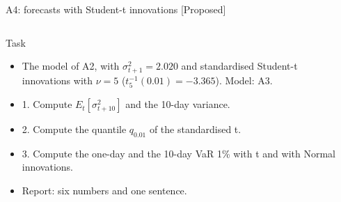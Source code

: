 \begin{frame}{A4: forecasts with Student-t innovations [Proposed]}
\propsub
\itemsize{\scriptsize}
\begin{columns}[T]
\begin{column}{\taskw}
\begin{block}{Task}
\begin{itemize}
    \item The model of A2, with $\sigma_{t+1}^2 = 2.020$ and standardised Student-t innovations with $\nu = 5$ ($t_5^{-1}(0.01) = -3.365$). Model: A3.
    \item 1. Compute $E_t[\sigma_{t+10}^2]$ and the 10-day variance.
    \item 2. Compute the quantile $q_{0.01}$ of the standardised t.
    \item 3. Compute the one-day and the 10-day VaR 1\% with t and with Normal innovations.
    \item Report: six numbers and one sentence.
\end{itemize}
\end{block}
\end{column}
\begin{column}{\solw}
\end{column}
\end{columns}
\end{frame}

